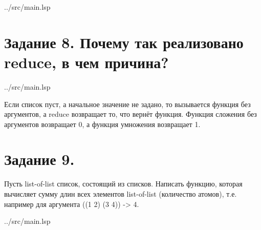 \begin{lstinputlisting}[
	caption={Задание 7},
	label={lst:t7},
	style={lsp},
	linerange={95-99},
	]{../src/main.lsp}
\end{lstinputlisting}

\section*{Задание 8. Почему так реализовано reduce, в чем причина?}

\begin{lstinputlisting}[
	caption={Задание 8},
	label={lst:t8},
	style={lsp},
	linerange={101-102},
	]{../src/main.lsp}
\end{lstinputlisting}

Если список пуст, а начальное значение не задано, то вызывается функция без аргументов, а reduce возвращает то, что вернёт функция. Функция сложения без аргументов возвращает 0, а функция умножения возвращает 1.

\section*{Задание 9. }
Пусть list-of-list список, состоящий из списков. Написать функцию, которая вычисляет сумму длин всех элементов list-of-list (количество атомов), т.е. например для аргумента ((1 2) (3 4)) -> 4.

\clearpage

\begin{lstinputlisting}[
	caption={Задание 9},
	label={lst:t9-1},
	style={lsp},
	linerange={104-112},
	]{../src/main.lsp}
\end{lstinputlisting}





